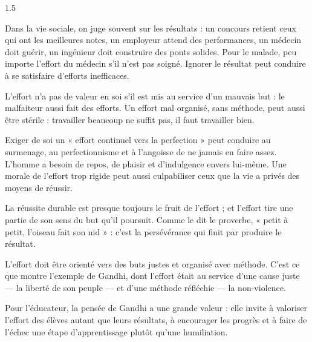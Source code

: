 \documentclass[12pt]{article}
\begin{document}
\begin{spacing}{1.5}


Dans la vie sociale, on juge souvent sur les résultats : un concours retient ceux qui ont les meilleures notes, un employeur attend des performances, un médecin doit guérir, un ingénieur doit construire des ponts solides. Pour le malade, peu importe l'effort du médecin s'il n'est pas soigné. Ignorer le résultat peut conduire à se satisfaire d'efforts inefficaces.

L'effort n'a pas de valeur en soi s'il est mis au service d'un mauvais but : le malfaiteur aussi fait des efforts. Un effort mal organisé, sans méthode, peut aussi être stérile : travailler beaucoup ne suffit pas, il faut travailler bien.

Exiger de soi un « effort continuel vers la perfection » peut conduire au surmenage, au perfectionnisme et à l'angoisse de ne jamais en faire assez. L'homme a besoin de repos, de plaisir et d'indulgence envers lui-même. Une morale de l'effort trop rigide peut aussi culpabiliser ceux que la vie a privés des moyens de réussir.



La réussite durable est presque toujours le fruit de l'effort ; et l'effort tire une partie de son sens du but qu'il poursuit. Comme le dit le proverbe, « petit à petit, l'oiseau fait son nid » : c'est la persévérance qui finit par produire le résultat.

L'effort doit être orienté vers des buts justes et organisé avec méthode. C'est ce que montre l'exemple de Gandhi, dont l'effort était au service d'une cause juste — la liberté de son peuple — et d'une méthode réfléchie — la non-violence.

Pour l'éducateur, la pensée de Gandhi a une grande valeur : elle invite à valoriser l'effort des élèves autant que leurs résultats, à encourager les progrès et à faire de l'échec une étape d'apprentissage plutôt qu'une humiliation.


\end{spacing}
\end{document}
